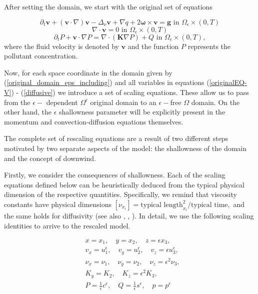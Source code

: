\documentclass[11pt]{article}
\begin{document}
After setting the domain, we start with the original set of equations

\begin{equation} \label{originalEQ-V}
\partial_t \mathbf{v} + (\mathbf{v} \cdot \nabla)\mathbf{v} -\Delta_{\nu} \mathbf{v} + \nabla q + 2 \mathbf{\omega} \times \mathbf{v}= \mathbf{g} \text{ in } \Omega_{\epsilon} \times (0,T)
\end{equation}
%
\begin{equation} \label{originalEQ-I}
\nabla \cdot \mathbf{v} = 0 \text{ in } \Omega_{\epsilon} \times (0,T)
\end{equation}
%
\begin{equation} \label{diffusive}
\partial_t P + \mathbf{v} \cdot \nabla P = \nabla \cdot (\mathbf{K} \nabla P) + Q \text{ in } \Omega_{\epsilon} \times (0,T),
\end{equation}
%
where the fluid velocity is denoted by $\mathbf{v}$ and the function $P$ represents the pollutant concentration.

Now, for each space coordinate in the domain given by (\ref{original_domain_eps_including}) and all variables in equations (\ref{originalEQ-V}) - (\ref{diffusive}) we introduce a set of scaling equations. These allow us to pass from the $\epsilon-$ dependent $\Omega^\epsilon$ original domain to an $\epsilon-$free $\Omega$ domain. On the other hand, the $\epsilon$ shallowness parameter will be explicitly present in the momentum and convection-diffusion equations themselves.

The complete set of rescaling equations are a result of two different steps motivated by two separate aspects of the model: the shallowness of the domain and the concept of downwind.

Firstly, we consider the consequences of shallowness. Each of the scaling equations defined below can be heuristically deduced from the typical physical dimension of the respective quantities. Specifically, we remind that viscosity constants have physical dimensions $[\nu_{x_i}] = \text{typical length}_{x_i}^2 / \text{typical time},$ and the same holds for diffusivity (see also \cite{azerad2001mathematical}, \cite{besson1992some}, \cite{pollatmws2019}). In detail, we use the following scaling identities to arrive to the rescaled model.

\begin{equation} \label{shallownessscalingeqs}
\begin{split}
& x = x_1, \quad y = x_2, \quad z = \epsilon x_3, \\
& v_x = u_1^{\epsilon}, \quad v_y = u_2^{\epsilon}, \quad v_z = \epsilon u_3^{\epsilon}, \\
& \nu_x = \nu_1, \quad \nu_y = \nu_2 , \quad \nu_z = \epsilon ^ 2\nu_3, \\
& K_y = K_2 , \quad K_z = \epsilon^2 K_3, \\
& P = \frac{1}{\epsilon} c^\epsilon, \quad Q = \frac{1}{\epsilon} s^\epsilon, \quad p = p^{\epsilon}
\end{split}
\end{equation}
\end{document}
